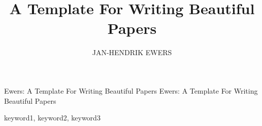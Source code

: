 \documentclass{ieeeaccess}
\begin{document}

\title{A Template For Writing Beautiful Papers}
\author{\uppercase{Jan-Hendrik Ewers}}

\address[1]{Aerospace Sciences Research Division, School of Engineering, University of Glasgow, Glasgow, Scotland, G12 8QQ}

\markboth
{Ewers: A Template For Writing Beautiful Papers}
{Ewers: A Template For Writing Beautiful Papers}




\begin{keywords}
    keyword1, keyword2, keyword3
\end{keywords}

\titlepgskip=-21pt

\maketitle









\EOD{}



\end{document}
